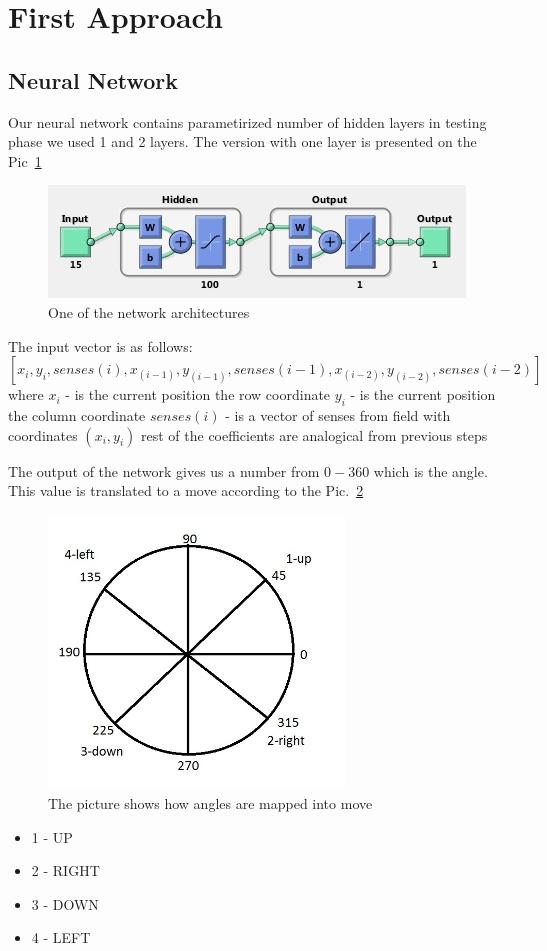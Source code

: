 \documentclass[a4paper]{article}
\begin{document}
\section{First Approach}
\subsection{Neural Network}
	Our neural network contains parametirized number of hidden layers in testing phase we 
	used 1 and 2 layers. The version with one layer is presented on the Pic~\ref{pic:networkExample}
	\begin{figure}[!h]
		\centering	
		\includegraphics[width=\textwidth]{pic/networkExample.jpg}
		\caption{One of the network architectures}
		\label{pic:networkExample}
	\end{figure}
	
 The input vector is as follows:
	$$
		[x_i, y_i, senses(i), x_(i-1), y_(i-1), senses(i-1), x_(i-2), y_(i-2), senses(i-2)]
	$$
	where 
		$x_i$ - is the current position the row coordinate
		$y_i$ - is the current position the column coordinate
		$senses(i)$ - is a vector of senses from field with coordinates $(x_i, y_i)$
		rest of the coefficients are analogical from previous steps
	
	The output of the network gives us a number from $0-360$ which is the angle. This value
	is translated to a move according to the Pic.~\ref{pic:compass}
	\begin{figure}[!h]
	\centering	
	\includegraphics[width=0.7\textwidth]{pic/kompass.jpg}
	\caption{The picture shows how angles are mapped into move}
\label{pic:compass}
\end{figure}
	\begin{itemize}
		\item 1 - UP
		\item 2 - RIGHT
		\item 3 - DOWN
		\item 4 - LEFT
	\end{itemize}
	
\end{document}
